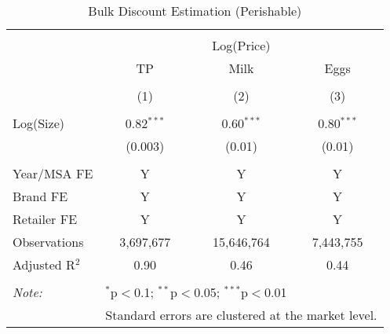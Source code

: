 
\begin{table}[!htbp] \centering 
  \caption{Bulk Discount Estimation (Perishable)} 
  \label{tab:bulkDiscountPerishable} 
\begin{tabular}{@{\extracolsep{5pt}}lccc} 
\\[-1.8ex]\hline 
\hline \\[-1.8ex] 
 & \multicolumn{3}{c}{Log(Price)} \\ 
\cline{2-4} 
 & TP & Milk & Eggs \\ 
\\[-1.8ex] & (1) & (2) & (3)\\ 
\hline \\[-1.8ex] 
 Log(Size) & 0.82$^{***}$ & 0.60$^{***}$ & 0.80$^{***}$ \\ 
  & (0.003) & (0.01) & (0.01) \\ 
 \hline \\[-1.8ex] 
Year/MSA FE & Y & Y & Y \\ 
Brand FE & Y & Y & Y \\ 
Retailer FE & Y & Y & Y \\ 
Observations & 3,697,677 & 15,646,764 & 7,443,755 \\ 
Adjusted R$^{2}$ & 0.90 & 0.46 & 0.44 \\ 
\hline 
\hline \\[-1.8ex] 
\textit{Note:}  & \multicolumn{3}{l}{$^{*}$p$<$0.1; $^{**}$p$<$0.05; $^{***}$p$<$0.01} \\ 
 & \multicolumn{3}{l}{Standard errors are clustered at the market level.} \\ 
\end{tabular} 
\end{table} 
